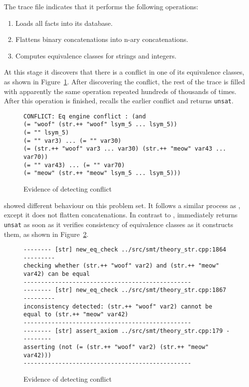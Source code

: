             The \cvc{} trace file indicates that it performs the following operations:

            \begin{enumerate}
                \item Loads all facts into its database.
                \item Flattens binary concatenations into n-ary concatenations.
                \item Computes equivalence classes for strings and integers.
            \end{enumerate}

            At this stage it discovers that there is a conflict in one of its equivalence classes, as shown in Figure~\ref{fig:cvc4-conflict}. After discovering the conflict, the rest of the trace is filled with apparently the same operation repeated hundreds of thousands of times. After this operation is finished, \cvc{} recalls the earlier conflict and returns \texttt{unsat}.

            \begin{figure}[h]
                {\scriptsize\begin{verbatim}
CONFLICT: Eq engine conflict : (and
(= "woof" (str.++ "woof" lsym_5 ... lsym_5))
(= "" lsym_5)
(= "" var3) ... (= "" var30)
(= (str.++ "woof" var3 ... var30) (str.++ "meow" var43 ... var70))
(= "" var43) ... (= "" var70)
(= "meow" (str.++ "meow" lsym_5 ... lsym_5)))\end{verbatim}}
                \caption{Evidence of \cvc{} detecting conflict}
                \label{fig:cvc4-conflict}
            \end{figure}

            \us{} showed different behaviour on this problem set. It follows a similar process as \cvc{}, except it does not flatten concatenations. In contrast to \cvc{}, \us{} immediately returns \texttt{unsat} as soon as it verifies consistency of equivalence classes as it constructs them, as shown in Figure~\ref{fig:z3str3-conflict}.

            \begin{figure}[h]
                {\scriptsize\begin{verbatim}
-------- [str] new_eq_check ../src/smt/theory_str.cpp:1864 ---------
checking whether (str.++ "woof" var2) and (str.++ "meow" var42) can be equal
------------------------------------------------
-------- [str] new_eq_check ../src/smt/theory_str.cpp:1867 ---------
inconsistency detected: (str.++ "woof" var2) cannot be equal to (str.++ "meow" var42)
------------------------------------------------
-------- [str] assert_axiom ../src/smt/theory_str.cpp:179 ---------
asserting (not (= (str.++ "woof" var2) (str.++ "meow" var42)))
------------------------------------------------\end{verbatim}}
                \caption{Evidence of \us{} detecting conflict}
                \label{fig:z3str3-conflict}
            \end{figure}


